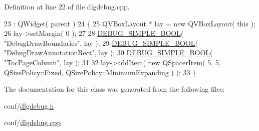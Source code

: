 Definition at line 22 of file dlgdebug.\+cpp.


\begin{DoxyCode}
23     : QWidget( parent )
24 \{
25     QVBoxLayout * lay = \textcolor{keyword}{new} QVBoxLayout( \textcolor{keyword}{this} );
26     lay->setMargin( 0 );
27 
28     \hyperlink{dlgdebug_8cpp_a21b0fcbf5794b5490062e4eb15e4dad8}{DEBUG\_SIMPLE\_BOOL}( \textcolor{stringliteral}{"DebugDrawBoundaries"}, lay );
29     \hyperlink{dlgdebug_8cpp_a21b0fcbf5794b5490062e4eb15e4dad8}{DEBUG\_SIMPLE\_BOOL}( \textcolor{stringliteral}{"DebugDrawAnnotationRect"}, lay );
30     \hyperlink{dlgdebug_8cpp_a21b0fcbf5794b5490062e4eb15e4dad8}{DEBUG\_SIMPLE\_BOOL}( \textcolor{stringliteral}{"TocPageColumn"}, lay );
31 
32     lay->addItem( \textcolor{keyword}{new} QSpacerItem( 5, 5, QSizePolicy::Fixed, QSizePolicy::MinimumExpanding ) );
33 \}
\end{DoxyCode}


The documentation for this class was generated from the following files\+:\begin{DoxyCompactItemize}
\item 
conf/\hyperlink{dlgdebug_8h}{dlgdebug.\+h}\item 
conf/\hyperlink{dlgdebug_8cpp}{dlgdebug.\+cpp}\end{DoxyCompactItemize}
